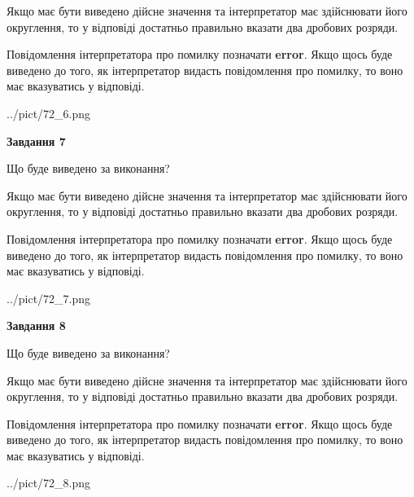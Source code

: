 \documentclass[12pt, ukrainian]{article}
\begin{document}
{\begin {Large}
Якщо має бути виведено дійсне значення та інтерпретатор має здійснювати його округлення, 
то у відповіді достатньо правильно вказати два дробових розряди.

Повідомлення інтерпретатора про помилку позначати \textbf{error}.
Якщо щось буде виведено до того, як інтерпретатор видасть повідомлення про помилку, 
то воно має вказуватись у відповіді. \par

\begin{center}
	{../pict/72_6.png}
\end{center}
\newpage

{\begin {center}\textbf{Завдання 7}\end {center}}\par
Що буде виведено за виконання? \par

Якщо має бути виведено дійсне значення та інтерпретатор має здійснювати його округлення, 
то у відповіді достатньо правильно вказати два дробових розряди.

Повідомлення інтерпретатора про помилку позначати \textbf{error}.
Якщо щось буде виведено до того, як інтерпретатор видасть повідомлення про помилку, 
то воно має вказуватись у відповіді. \par

\begin{center}
	{../pict/72_7.png}
\end{center}
\newpage

{\begin {center}\textbf{Завдання 8}\end {center}}\par
Що буде виведено за виконання? \par

Якщо має бути виведено дійсне значення та інтерпретатор має здійснювати його округлення, 
то у відповіді достатньо правильно вказати два дробових розряди.

Повідомлення інтерпретатора про помилку позначати \textbf{error}.
Якщо щось буде виведено до того, як інтерпретатор видасть повідомлення про помилку, 
то воно має вказуватись у відповіді. \par

\begin{center}
	{../pict/72_8.png}
\end{center}
\newpage


\end{Large}}
\end{document}
